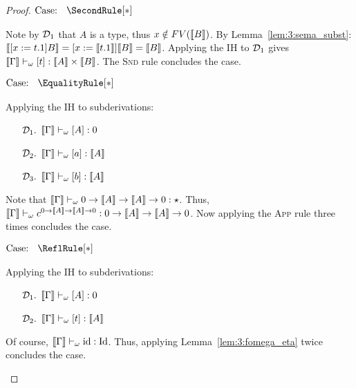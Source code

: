 \begin{proof}
    $\text{Case: }\begin{array}{c} \SecondRule[*] \end{array}$
    \begin{proofcase}
        Note by $\mathcal{D}_{1}$ that $A$ is a type, thus $x \notin FV(\llbracket B \rrbracket)$.
        By Lemma~\ref{lem:3:sema_subst}: $\llbracket [x := t.1]B \rrbracket = [x := \llbracket t.1 \rrbracket]\llbracket B \rrbracket = \llbracket B \rrbracket$.
        Applying the IH to $\mathcal{D}_{1}$ gives $\llbracket \Gamma \rrbracket \vdash_\omega [t] : \llbracket A \rrbracket \times \llbracket B \rrbracket$.
        The \textsc{Snd} rule concludes the case.
    \end{proofcase}

    $\text{Case: }\begin{array}{c} \EqualityRule[*] \end{array}$
    \begin{proofcase}
        Applying the IH to subderivations:
        \begin{enumerate}
            \item[$\mathcal{D}_{1}.$] $\llbracket \Gamma \rrbracket \vdash_\omega [A] : 0$
            \item[$\mathcal{D}_{2}.$] $\llbracket \Gamma \rrbracket \vdash_\omega [a] : \llbracket A \rrbracket$
            \item[$\mathcal{D}_{3}.$] $\llbracket \Gamma \rrbracket \vdash_\omega [b] : \llbracket A \rrbracket$
        \end{enumerate}
        Note that $\llbracket \Gamma \rrbracket \vdash_\omega 0 \to \llbracket A \rrbracket \to \llbracket A \rrbracket \to 0 : \star$.
        Thus, $\llbracket \Gamma \rrbracket \vdash_\omega c^{0 \to \llbracket A \rrbracket \to \llbracket A \rrbracket \to 0} : 0 \to \llbracket A \rrbracket \to \llbracket A \rrbracket \to 0$.
        Now applying the \textsc{App} rule three times concludes the case.
    \end{proofcase}

    $\text{Case: }\begin{array}{c} \ReflRule[*] \end{array}$
    \begin{proofcase}
        Applying the IH to subderivations:
        \begin{enumerate}
            \item[$\mathcal{D}_{1}.$] $\llbracket \Gamma \rrbracket \vdash_\omega [A] : 0$
            \item[$\mathcal{D}_{2}.$] $\llbracket \Gamma \rrbracket \vdash_\omega [t] : \llbracket A \rrbracket$
        \end{enumerate}
        Of course, $\llbracket \Gamma \rrbracket \vdash_\omega \text{id} : \text{Id}$.
        Thus, applying Lemma~\ref{lem:3:fomega_eta} twice concludes the case.
    \end{proofcase}


\end{proof}
